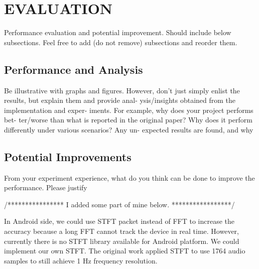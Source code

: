 \documentclass{acm_proc_article-sp}
\begin{document}
\section{EVALUATION} \label{evaluation}
Performance evaluation and potential improvement.  Should
include below subsections.  Feel free to add (do not remove)
subsections and reorder them.

\subsection{Performance and Analysis}
Be illustrative with graphs and figures.  However, don’t just
simply enlist the results, but explain them and provide anal-
ysis/insights obtained from the implementation and exper-
iments.  For example, why does your project performs bet-
ter/worse than what is reported in the original paper?  Why
does it perform differently under various scenarios?  Any un-
expected results are found, and why

\subsection{Potential Improvements}
From  your  experiment  experience,  what  do  you  think  can
be done to improve the performance.  Please justify

/****************
I added some part of mine below.
*****************/

In Android side, we could use STFT packet instead of FFT to increase the accuracy
because a long FFT cannot track the device in real time. However, currently there is 
no STFT library available for Android platform. We could implement our own STFT. 
The original work applied STFT to use 1764 audio samples to still achieve 1 Hz frequency
resolution.

%

%
%
\end{document}
